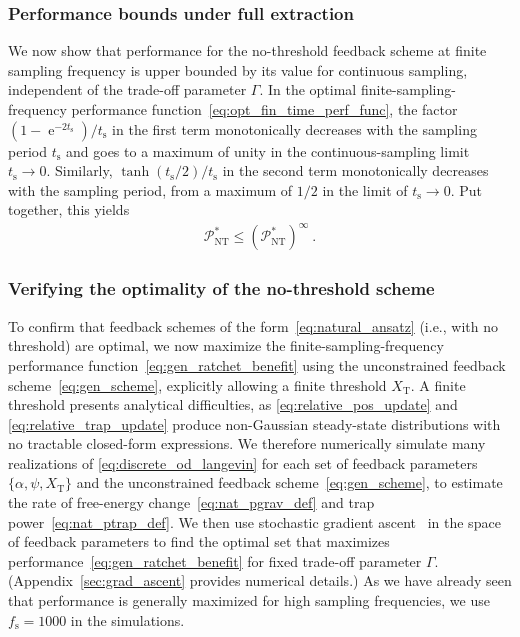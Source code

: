 \documentclass[%
reprint,
bibnotes, amsmath, amssymb, aps, pre,
 showkeys,
floatfix
]{revtex4-2}
\newcommand{\mrm}{\mathrm}
\newcommand{\mcal}{\mathcal}
\newcommand{\pr}[1]{\left(#1\right)} %
\newcommand{\ts}{t_{\mrm{s}}}
\newcommand{\fs}{f_{\mrm{s}}}
\newcommand{\xT}{X_{\mrm{T}}}
\newcommand{\mP}{\mcal{P}}
\DeclareMathOperator{\e}{e}
\begin{document}
\subsubsection{Performance bounds under full extraction}
\label{subsubsec:performance_bounds_under_full_extraction}
We now show that performance for the no-threshold feedback scheme at finite sampling frequency is upper bounded by its value for continuous sampling, independent of the trade-off parameter $\Gamma$. 
In the optimal finite-sampling-frequency performance function~\eqref{eq:opt_fin_time_perf_func}, the factor $(1-\e^{-2\ts})/\ts$ in the first term monotonically decreases with the sampling period $\ts$ and goes to a maximum of unity in the continuous-sampling limit $\ts\to 0$. 
Similarly, $\tanh\pr{\ts/2}/\ts$ in the second term monotonically decreases with the sampling period, from a maximum of $1/2$ in the limit of $\ts\to 0$.
Put together, this yields
\begin{align}
    \mP_{\mrm{NT}}^{*} \le \pr{\mP_{\mrm{NT}}^{*}}^{\infty} \ .
\end{align}


\subsubsection{Verifying the optimality of the no-threshold scheme}
\label{subsubsec:hypothesis_verification}
To confirm that feedback schemes of the form~\eqref{eq:natural_ansatz} (i.e., with no threshold) are optimal, we now maximize the finite-sampling-frequency performance function~\eqref{eq:gen_ratchet_benefit} using the unconstrained feedback scheme~\eqref{eq:gen_scheme}, explicitly allowing a finite threshold $\xT$. 
A finite threshold presents analytical difficulties, as \eqref{eq:relative_pos_update} and \eqref{eq:relative_trap_update} produce non-Gaussian steady-state distributions with no tractable closed-form expressions.
We therefore numerically simulate many realizations of \eqref{eq:discrete_od_langevin} for each set of feedback parameters $\{\alpha,\psi,\xT\}$ and the unconstrained feedback scheme~\eqref{eq:gen_scheme}, to estimate the rate of free-energy change~\eqref{eq:nat_pgrav_def} and trap power~\eqref{eq:nat_ptrap_def}.
We then use stochastic gradient ascent~\cite{Wales1997} in the space of feedback parameters to find the optimal set that maximizes performance~\eqref{eq:gen_ratchet_benefit} for fixed trade-off parameter $\Gamma$.
(Appendix~\ref{sec:grad_ascent} provides numerical details.)
As we have already seen that performance is generally maximized for high sampling frequencies, we use $\fs = 1000$ in the simulations.
\end{document}
